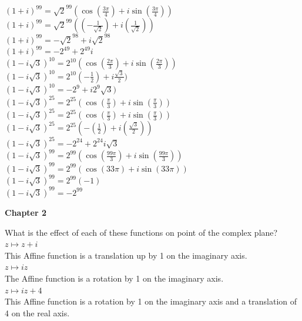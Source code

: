 \documentclass[12pt]{article}
\begin{document}
$(1 + i)^{99} = \sqrt{2}^{99}(\cos(\frac{3\pi}{4}) + i\sin(\frac{3\pi}{4}))$\\
$(1 + i)^{99} = \sqrt{2}^{99}((-\frac{1}{\sqrt{2}}) + i(\frac{1}{\sqrt{2}}))$\\
$(1 + i)^{99} = -\sqrt{2}^{98} + i\sqrt{2}^{98}$\\
$(1 + i)^{99} = -2^{49} + 2^{49}i$\\


$(1 - i\sqrt{3})^{10} = 2^{10}(\cos(\frac{2\pi}{3}) + i\sin(\frac{2\pi}{3}))$\\
$(1 - i\sqrt{3})^{10} = 2^{10}(-\frac{1}{2}) + i\frac{\sqrt{3}}{2})$\\
$(1 - i\sqrt{3})^{10} = -2^{9} + i2^{9}\sqrt{3})$\\

$(1 - i\sqrt{3})^{25} = 2^{25}(\cos(\frac{\pi}{3}) + i\sin(\frac{\pi}{3}))$\\
$(1 - i\sqrt{3})^{25} = 2^{25}(\cos(\frac{\pi}{3}) + i\sin(\frac{\pi}{3}))$\\
$(1 - i\sqrt{3})^{25} = 2^{25}(-(\frac{1}{2}) + i(\frac{\sqrt{3}}{2}))$\\
$(1 - i\sqrt{3})^{25} = -2^{24} + 2^{24}i\sqrt{3}$\\


$(1 - i\sqrt{3})^{99} = 2^{99}(\cos(\frac{99\pi}{3}) + i\sin(\frac{99\pi}{3}))$\\
$(1 - i\sqrt{3})^{99} = 2^{99}(\cos(33\pi) + i\sin(33\pi))$\\
$(1 - i\sqrt{3})^{99} = 2^{99}(-1)$\\
$(1 - i\sqrt{3})^{99} = -2^{99}$\\

\begin{center}
\textbf{\large Chapter 2}
\end{center}

 What is the effect of each of these functions on point of the complex plane?\\


 $z \mapsto z + i$\\
This Affine function is a translation up by 1 on the imaginary axis.\\


 $z \mapsto iz$\\
The Affine function is a rotation by 1 on the imaginary axis.\\


 $z \mapsto iz + 4$\\
This Affine function is a rotation by 1 on the imaginary axis and a translation of 4 on the real axis.\\
\end{document}
